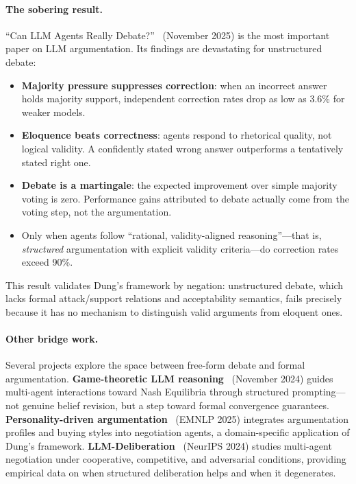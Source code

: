 \documentclass{article}
\begin{document}
\paragraph{The sobering result.}
``Can LLM Agents Really Debate?''~\citep{debate2025can} (November 2025) is the most
important paper on LLM argumentation. Its findings are devastating for unstructured
debate:
\begin{itemize}[nosep]
  \item \textbf{Majority pressure suppresses correction}: when an incorrect answer holds
    majority support, independent correction rates drop as low as 3.6\% for weaker
    models.
  \item \textbf{Eloquence beats correctness}: agents respond to rhetorical quality,
    not logical validity. A confidently stated wrong answer outperforms a tentatively
    stated right one.
  \item \textbf{Debate is a martingale}: the expected improvement over simple majority
    voting is zero. Performance gains attributed to debate actually come from the
    voting step, not the argumentation.
  \item Only when agents follow ``rational, validity-aligned reasoning''---that is,
    \emph{structured} argumentation with explicit validity criteria---do correction
    rates exceed 90\%.
\end{itemize}
This result validates Dung's framework by negation: unstructured debate, which lacks
formal attack/support relations and acceptability semantics, fails precisely because
it has no mechanism to distinguish valid arguments from eloquent ones.

\paragraph{Other bridge work.}
Several projects explore the space between free-form debate and formal argumentation.
\textbf{Game-theoretic LLM reasoning}~\citep{gametheollm2024} (November 2024) guides
multi-agent interactions toward Nash Equilibria through structured prompting---not
genuine belief revision, but a step toward formal convergence guarantees.
\textbf{Personality-driven argumentation}~\citep{personalityarg2025} (EMNLP 2025)
integrates argumentation profiles and buying styles into negotiation agents, a
domain-specific application of Dung's framework.
\textbf{LLM-Deliberation}~\citep{llmdeliberation2024} (NeurIPS 2024) studies
multi-agent negotiation under cooperative, competitive, and adversarial conditions,
providing empirical data on when structured deliberation helps and when it degenerates.
\end{document}
